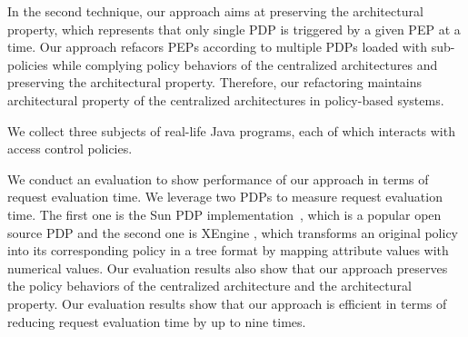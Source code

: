 In the second technique, our approach aims at preserving the architectural property, which represents that only single PDP is triggered by a given PEP at a time.
Our approach refacors PEPs according to multiple PDPs loaded with sub-policies while complying policy behaviors of the centralized architectures 
and preserving the architectural property. 
Therefore, our refactoring maintains architectural property of the centralized architectures in policy-based systems.
 






We collect three subjects of real-life Java programs, each of which interacts
with access control policies.

 
We conduct an evaluation to show performance of our approach in terms of request evaluation time.
We leverage two PDPs to measure request evaluation time. The first one is the
Sun PDP implementation~\cite{oasis}, which is a popular open source PDP and the second one is 
XEngine \cite{Xengine}, which transforms an original policy
into its corresponding policy in a tree format by mapping attribute values with numerical values.
Our evaluation results also show that our approach
preserves the policy behaviors of the centralized architecture and the architectural property. Our evaluation results show that our approach
is efficient in terms of reducing request evaluation time by up to nine times. 


